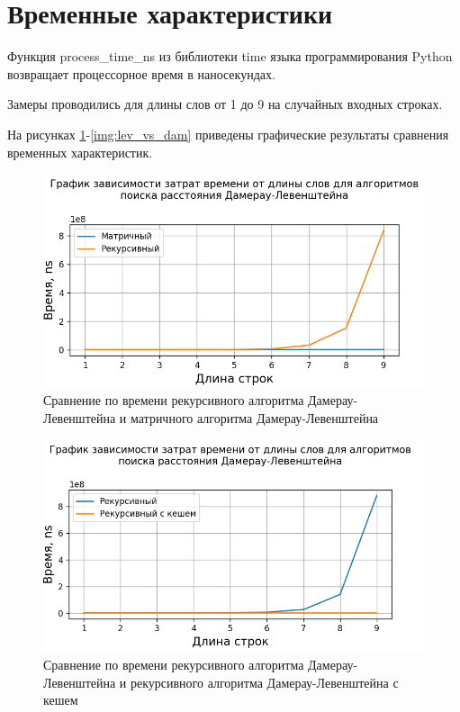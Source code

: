 \section{Временные характеристики}

Функция process\_time\_ns из библиотеки time языка программирования Python возвращает  процессорное время в наносекундах.

Замеры проводились для длины слов от 1 до 9 на случайных входных строках.

На рисунках \ref{img:dam_lev_rec_vs_matrix}-\ref{img:lev_vs_dam} приведены графические результаты сравнения временных характеристик.

\begin{figure}[H]
	\begin{center}
		\includegraphics[scale=0.7]{img/dam_lev_rec_vs_matrix.png}
	\end{center}
	\captionsetup{justification=centering}
	\caption{Сравнение по времени рекурсивного алгоритма Дамерау-Левенштейна и матричного алгоритма Дамерау-Левенштейна}
	\label{img:dam_lev_rec_vs_matrix}
\end{figure}

\begin{figure}[H]
	\begin{center}
		\includegraphics[scale=0.7]{img/dam_lev_rec_vs_cache.png}
	\end{center}
	\captionsetup{justification=centering}
	\caption{Сравнение по времени рекурсивного алгоритма Дамерау-Левенштейна и рекурсивного алгоритма Дамерау-Левенштейна с кешем}
	\label{img:dam_lev_rec_vs_cache}
\end{figure}

